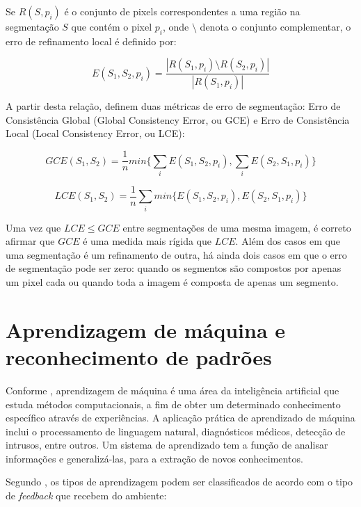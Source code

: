 Se $R(S,p_i)$ é o conjunto de pixels correspondentes a uma região na segmentação $S$ que contém o pixel $p_i$, onde $\setminus$ denota o conjunto complementar, o erro de refinamento local é definido por:

\begin{equation}
	\displaystyle E(S_1,S_2,p_i) = \frac{|R(S_1,p_i) \setminus R(S_2,p_i)|}{|R(S_1,p_i)|}
\end{equation}


A partir desta relação,  definem duas métricas de erro de segmentação: Erro de Consistência Global (Global Consistency Error, ou GCE) e Erro de Consistência Local (Local Consistency Error, ou LCE):

\begin{equation}
	\displaystyle GCE(S_1,S_2) = \frac{1}{n} min \biggl\{ \sum_{i} E(S_1,S_2,p_i), \sum_{i} E(S_2,S_1,p_i) \biggr\}
\end{equation}

\begin{equation}
	\displaystyle LCE(S_1,S_2) = \frac{1}{n} \sum_{i} min \biggl\{ E(S_1,S_2,p_i), E(S_2,S_1,p_i) \biggr\}
\end{equation}

Uma vez que $LCE \leq GCE$ entre segmentações de uma mesma imagem, é correto afirmar que $GCE$ é uma medida mais rígida que $LCE$. Além dos casos em que uma segmentação é um refinamento de outra, há ainda dois casos em que o erro de segmentação pode ser zero: quando os segmentos são compostos por apenas um pixel cada ou quando toda a imagem é composta de apenas um segmento.

\section{Aprendizagem de máquina e reconhecimento de padrões}

Conforme , aprendizagem de máquina é uma área da inteligência artificial que estuda métodos computacionais, a fim de obter um determinado conhecimento específico através de experiências. A aplicação prática de aprendizado de máquina inclui o processamento de linguagem natural, diagnósticos médicos, detecção de intrusos, entre outros. Um sistema de aprendizado tem a função de analisar informações e generalizá-las, para a extração de novos conhecimentos.

Segundo , os tipos de aprendizagem podem ser classificados de acordo com o tipo de \textit{feedback} que recebem do ambiente:


